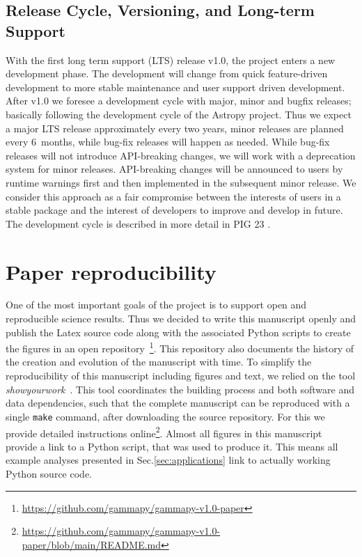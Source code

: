 \documentclass[longauth]{aa}
\newcommand{\code}[1]{\texttt{#1}}
\begin{document}
\subsection{Release Cycle, Versioning, and Long-term Support}
\label{ssec:release-cycle}
With the first long term support (LTS) release v1.0, the \gammapy project
enters a new development phase. The development will change from
quick feature-driven development to more stable maintenance
and user support driven development. After v1.0 we foresee
a development cycle with major, minor and bugfix releases;
basically following the development cycle of the Astropy
project. Thus we expect a major LTS release approximately
every two years, minor releases are planned every 6~months,
while bug-fix releases will happen as needed. While
bug-fix releases will not introduce API-breaking changes,
we will work with a deprecation system for minor releases.
API-breaking changes will be announced to users by runtime
warnings first and then implemented in the subsequent
minor release. We consider this approach as a fair
compromise between the interests of users in a stable
package and the interest of developers to improve
and develop \gammapy in future. The development cycle is described
in more detail in PIG 23 \citep{gammapy_pig_23}.

\section{Paper reproducibility}
\label{sec:reproducibility}
One of the most important goals of the \gammapy project is to support open and
reproducible science results. Thus we decided to write this manuscript
openly and publish the Latex source code along with the associated
Python scripts to create the figures
in an open repository~\footnote{\url{https://github.com/gammapy/gammapy-v1.0-paper}}.
This \github repository also documents the history of the creation
and evolution of the manuscript with time. To simplify the reproducibility
of this manuscript including figures and text, we relied on the tool
\textit{showyourwork}~\citep{Luger2021}. This tool coordinates the building
process and both software and data dependencies, such that the complete
manuscript can be reproduced with a single \code{make} command, after
downloading the source repository. For this we provide
detailed instructions online\footnote{\url{https://github.com/gammapy/gammapy-v1.0-paper/blob/main/README.md}}.
Almost all figures in this manuscript provide a link
to a Python script, that was used to produce it. This means all
example analyses presented in Sec.\ref{sec:applications} link to
actually working Python source code.
\end{document}
